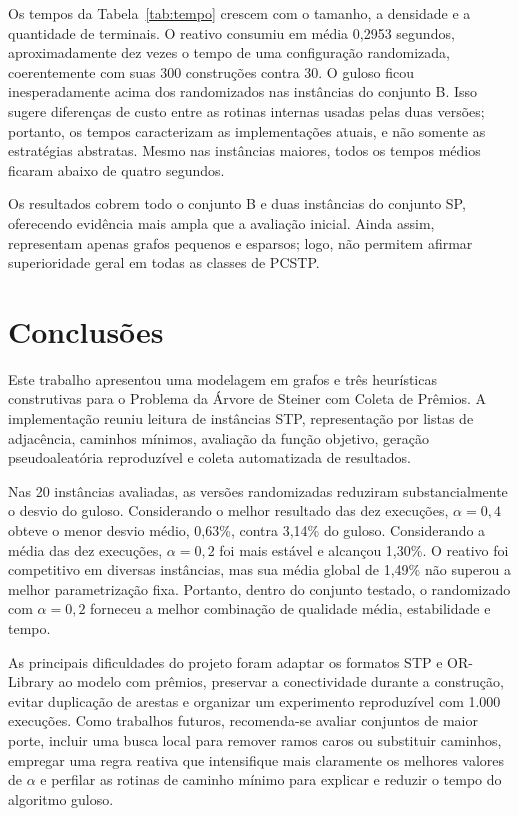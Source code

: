 \documentclass[12pt]{article}
\begin{document}
Os tempos da Tabela~\ref{tab:tempo} crescem com o tamanho, a densidade e a quantidade de terminais. O reativo consumiu em média 0,2953 segundos, aproximadamente dez vezes o tempo de uma configuração randomizada, coerentemente com suas 300 construções contra 30. O guloso ficou inesperadamente acima dos randomizados nas instâncias do conjunto B. Isso sugere diferenças de custo entre as rotinas internas usadas pelas duas versões; portanto, os tempos caracterizam as implementações atuais, e não somente as estratégias abstratas. Mesmo nas instâncias maiores, todos os tempos médios ficaram abaixo de quatro segundos.

Os resultados cobrem todo o conjunto B e duas instâncias do conjunto SP, oferecendo evidência mais ampla que a avaliação inicial. Ainda assim, representam apenas grafos pequenos e esparsos; logo, não permitem afirmar superioridade geral em todas as classes de PCSTP.

\section{Conclusões}
\label{sec:conclusoes}

Este trabalho apresentou uma modelagem em grafos e três heurísticas construtivas para o Problema da Árvore de Steiner com Coleta de Prêmios. A implementação reuniu leitura de instâncias STP, representação por listas de adjacência, caminhos mínimos, avaliação da função objetivo, geração pseudoaleatória reproduzível e coleta automatizada de resultados.

Nas 20 instâncias avaliadas, as versões randomizadas reduziram substancialmente o desvio do guloso. Considerando o melhor resultado das dez execuções, $\alpha=0{,}4$ obteve o menor desvio médio, 0,63\%, contra 3,14\% do guloso. Considerando a média das dez execuções, $\alpha=0{,}2$ foi mais estável e alcançou 1,30\%. O reativo foi competitivo em diversas instâncias, mas sua média global de 1,49\% não superou a melhor parametrização fixa. Portanto, dentro do conjunto testado, o randomizado com $\alpha=0{,}2$ forneceu a melhor combinação de qualidade média, estabilidade e tempo.

As principais dificuldades do projeto foram adaptar os formatos STP e OR-Library ao modelo com prêmios, preservar a conectividade durante a construção, evitar duplicação de arestas e organizar um experimento reproduzível com 1.000 execuções. Como trabalhos futuros, recomenda-se avaliar conjuntos de maior porte, incluir uma busca local para remover ramos caros ou substituir caminhos, empregar uma regra reativa que intensifique mais claramente os melhores valores de $\alpha$ e perfilar as rotinas de caminho mínimo para explicar e reduzir o tempo do algoritmo guloso.



\end{document}
